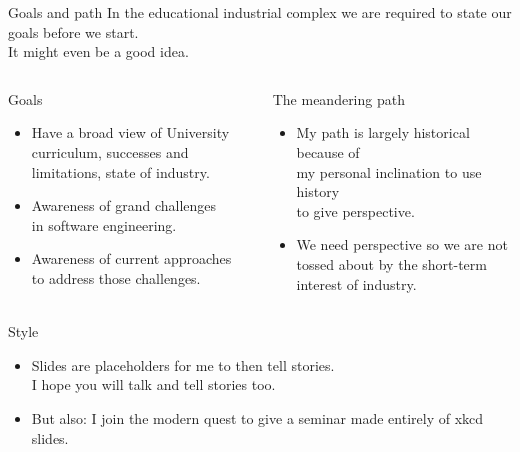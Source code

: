 \documentclass[10pt,aspectratio=169]{beamer}
\begin{document}
\begin{frame}{Goals and path}
  In the educational industrial complex we are required to state our
  goals before we start.\\
  It might even be a good idea.

  \begin{columns}[t]
    \begin{column}{0.5\textwidth}
      \begin{block}{Goals}
        \begin{itemize}
          \pause\item
          Have a broad view of University curriculum, successes and
          limitations, state of industry.\\
          \pause\item
          Awareness of grand challenges \\in software engineering.\\
          \pause\item
          Awareness of current approaches \\ to address those challenges.\\
        \end{itemize}
      \end{block}
    \end{column}
    \begin{column}{0.5\textwidth}
      \pause
      \begin{block}{The meandering path}
        \begin{itemize}
          \pause\item
          My path is largely historical because of \\ my personal inclination
          to use history \\ to give perspective.\\
          \pause\item
          We need perspective so we are not tossed about by the short-term
          interest of industry.
        \end{itemize}
      \end{block}
    \end{column}
  \end{columns}
  \pause
  \begin{block}{Style}
    \begin{itemize}
    \item
      Slides are placeholders for me to then tell stories.  \\ \pause
      I hope you will talk and tell stories too. \\ \pause
    \item
      But also: I join the modern quest to give a seminar made
      entirely of xkcd slides.
    \end{itemize}
  \end{block}
\end{frame}
\end{document}
